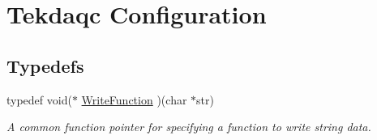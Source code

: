 \hypertarget{group__tekdaqc__configuration}{\section{Tekdaqc Configuration}
\label{group__tekdaqc__configuration}
}
\subsection*{Typedefs}
\begin{DoxyCompactItemize}
\item 
typedef void($\ast$ \hyperlink{group__tekdaqc__configuration_ga163b2a4cc55a569e988df48908631967}{Write\-Function} )(char $\ast$str)
\begin{DoxyCompactList}\small\item\em A common function pointer for specifying a function to write string data. \end{DoxyCompactList}\end{DoxyCompactItemize}
